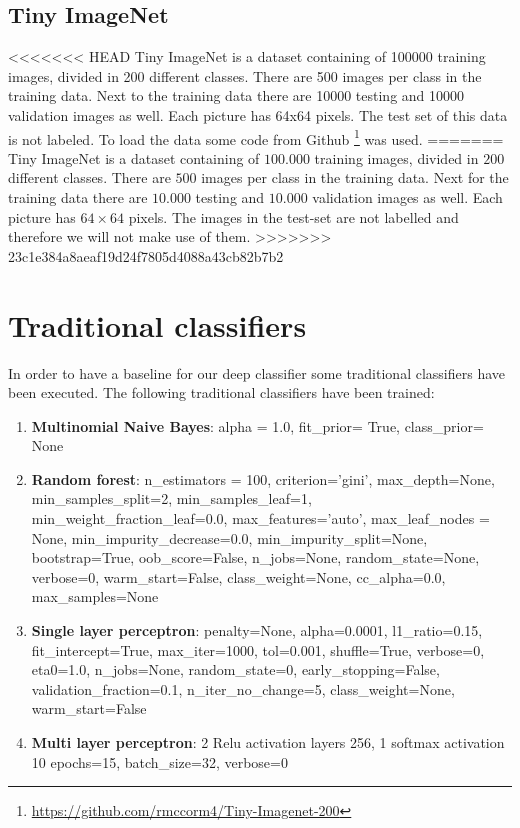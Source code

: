\documentclass[11pt]{article}
\begin{document}
\subsection{Tiny ImageNet}\label{Sec_ImageNet}
<<<<<<< HEAD
Tiny ImageNet is a dataset containing of 100000 training images, divided in 200 different classes. There are 500 images per class in the training data. Next to the training data there are 10000 testing and 10000 validation images as well. Each picture has 64x64 pixels. The test set of this data is not labeled. To load the data some code from Github \footnote{\url{https://github.com/rmccorm4/Tiny-Imagenet-200}} was used. 
=======
Tiny ImageNet is a dataset containing of $100.000$ training images, divided in $200$ different classes. There are $500$ images per class in the training data. Next for the training data there are $10.000$ testing and $10.000$ validation images as well. Each picture has $64\times64$ pixels. The images in the test-set are not labelled and therefore we will not make use of them.
>>>>>>> 23c1e384a8aeaf19d24f7805d4088a43cb82b7b2

\section{Traditional classifiers}

In order to have a baseline for our deep classifier some traditional classifiers have been executed. The following traditional classifiers have been trained:
\begin{enumerate}
\item{\textbf{Multinomial Naive Bayes}: alpha = 1.0, fit\_prior= True, class\_prior= None }
\item{\textbf{Random forest}: n\_estimators = 100, criterion='gini', max\_depth=None, min\_samples\_split=2, min\_samples\_leaf=1, min\_weight\_fraction\_leaf=0.0, max\_features='auto', max\_leaf\_nodes = None, min\_impurity\_decrease=0.0, min\_impurity\_split=None, bootstrap=True, oob\_score=False, n\_jobs=None, random\_state=None, verbose=0, warm\_start=False, class\_weight=None, cc\_alpha=0.0, max\_samples=None}
\item{\textbf{Single layer perceptron}:  penalty=None, alpha=0.0001, l1\_ratio=0.15, fit\_intercept=True, max\_iter=1000, tol=0.001, shuffle=True, verbose=0, eta0=1.0, n\_jobs=None, random\_state=0, early\_stopping=False, validation\_fraction=0.1, n\_iter\_no\_change=5, class\_weight=None, warm\_start=False}
\item{\textbf{Multi layer perceptron}: 2 Relu activation layers 256, 1 softmax activation 10  epochs=15, batch\_size=32, verbose=0}

\end{enumerate}
\end{document}
